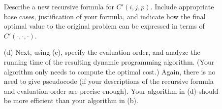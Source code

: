 \documentclass[11pt]{article}
\begin{document}
\begin{description}
\begin{enumerate}
Describe a new recursive formula for $C'(i,j,p)$.
Include appropriate base cases, justification of your formula, and indicate how the final optimal value to the original problem can be expressed in terms of $C'(\cdot,\cdot,\cdot)$.

\smallskip
\item[(d)]
Next, using (c), specify the evaluation order, and analyze the running time of the resulting dynamic programming algorithm.
(Your algorithm only needs to compute the optimal cost.)
Again, there is no need to give pseudocode (if your descriptions of the recursive formula and evaluation order are 
precise enough).  Your algorithm in (d) should be more efficient than your algorithm in (b).
\end{enumerate}


\end{description}
\end{document}
